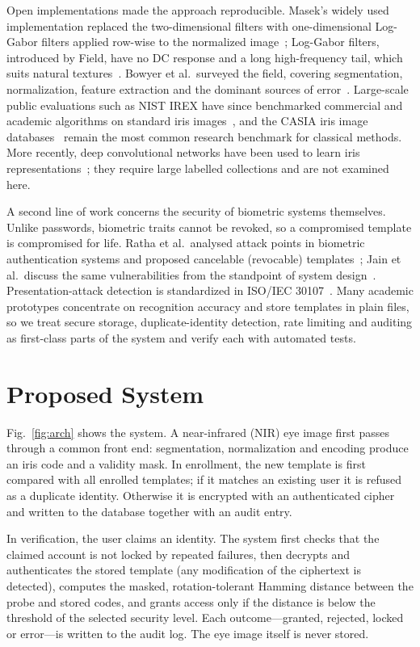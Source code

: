 \documentclass[conference]{IEEEtran}
\begin{document}
Open implementations made the approach reproducible. Masek's widely used implementation replaced the two-dimensional filters with one-dimensional Log-Gabor filters applied row-wise to the normalized image~\cite{masek2003}; Log-Gabor filters, introduced by Field, have no DC response and a long high-frequency tail, which suits natural textures~\cite{field1987}. Bowyer et al.\ surveyed the field, covering segmentation, normalization, feature extraction and the dominant sources of error~\cite{bowyer2008}. Large-scale public evaluations such as NIST IREX have since benchmarked commercial and academic algorithms on standard iris images~\cite{irex2009}, and the CASIA iris image databases~\cite{casia} remain the most common research benchmark for classical methods. More recently, deep convolutional networks have been used to learn iris representations~\cite{gangwar2016}; they require large labelled collections and are not examined here.

A second line of work concerns the security of biometric systems themselves. Unlike passwords, biometric traits cannot be revoked, so a compromised template is compromised for life. Ratha et al.\ analysed attack points in biometric authentication systems and proposed cancelable (revocable) templates~\cite{ratha2001}; Jain et al.\ discuss the same vulnerabilities from the standpoint of system design~\cite{jain2004}. Presentation-attack detection is standardized in ISO/IEC 30107~\cite{iso30107}. Many academic prototypes concentrate on recognition accuracy and store templates in plain files, so we treat secure storage, duplicate-identity detection, rate limiting and auditing as first-class parts of the system and verify each with automated tests.

\section{Proposed System}
Fig.~\ref{fig:arch} shows the system. A near-infrared (NIR) eye image first passes through a common front end: segmentation, normalization and encoding produce an iris code and a validity mask. In enrollment, the new template is first compared with all enrolled templates; if it matches an existing user it is refused as a duplicate identity. Otherwise it is encrypted with an authenticated cipher and written to the database together with an audit entry.

In verification, the user claims an identity. The system first checks that the claimed account is not locked by repeated failures, then decrypts and authenticates the stored template (any modification of the ciphertext is detected), computes the masked, rotation-tolerant Hamming distance between the probe and stored codes, and grants access only if the distance is below the threshold of the selected security level. Each outcome---granted, rejected, locked or error---is written to the audit log. The eye image itself is never stored.
\end{document}
